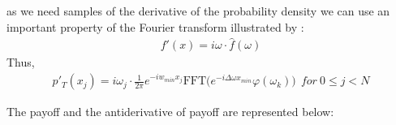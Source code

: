 \documentclass[12pt]{report}
\begin{document}
as we need samples of the derivative of the probability density we can use an important property of the Fourier transform illustrated by :
\begin{gather*}
f'(x)= i \omega \cdot \hat{f}(\omega)
\end{gather*}
Thus, 
\begin{gather}
p'_T(x_j)= i \omega_j \cdot   \frac{1}{2 \pi} e^{- iw_{min} x_j} \text{FFT}\big ( e^{-i \Delta\omega x_{min} } \varphi(\omega_k) \big) ~~for~ 0 \leqslant j < N
\end{gather}

The payoff and the antiderivative of payoff are represented below:


 
\end{document}
